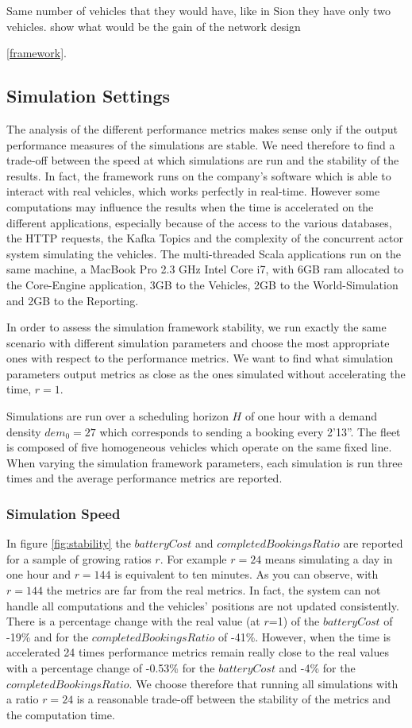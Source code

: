 \documentclass[12pt,a4paper]{article}
\begin{document}
Same number of vehicles that they would have, like in Sion they have only two vehicles.
show what would be the gain of the network design

\ref{framework}.

\subsection{Simulation Settings}\label{settings}
The analysis of the different performance metrics makes sense only if the output performance measures of the simulations are stable. We need therefore to find a trade-off between the speed at which simulations are run and the stability of the results. In fact, the framework runs on the company's software which is able to interact with real vehicles, which works perfectly in real-time. However some computations may influence the results when the time is accelerated on the different applications, especially because of the access to the various databases, the HTTP requests, the Kafka Topics and the complexity of the concurrent actor system simulating the vehicles. The multi-threaded Scala applications run on the same machine, a MacBook Pro 2.3 GHz Intel Core i7, with 6GB ram allocated to the Core-Engine application, 3GB to the Vehicles, 2GB to the World-Simulation and 2GB to the Reporting. 

In order to assess the simulation framework stability, we run exactly the same scenario with different simulation parameters and choose the most appropriate ones with respect to the performance metrics. We want to find what simulation parameters output metrics as close as the ones simulated without accelerating the time, $r=1$.

Simulations are run over a scheduling horizon $H$ of one hour with a demand density $dem_{0} = 27$ which corresponds to sending a booking every 2'13''. The fleet is composed of five homogeneous vehicles which operate on the same fixed line. When varying the simulation framework parameters, each simulation is run three times and the average performance metrics are reported. 

\subsubsection{Simulation Speed} In figure \ref{fig:stability} the $batteryCost$ and $completedBookingsRatio$ are reported for a sample of growing ratios $r$. For example $r = 24$ means simulating a day in one hour and $r=144$ is equivalent to ten minutes. As you can observe, with $r = 144$ the metrics are far from the real metrics. In fact, the system can not handle all computations and the vehicles' positions are not updated consistently. There is a percentage change with the real value (at $r$=1) of the $batteryCost$ of -19\% and for the $completedBookingsRatio$ of -41\%. However, when the time is accelerated 24 times performance metrics remain really close to the real values with a percentage change of -0.53\% for the $batteryCost$ and -4\% for the $completedBookingsRatio$. We choose therefore that running all simulations with a ratio $r=24$ is a reasonable trade-off between the stability of the metrics and the computation time.
\end{document}
